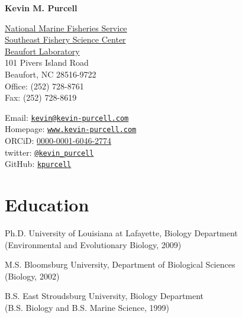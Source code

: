\documentclass[letterpaper]{article}
\def\name{Kevin M. Purcell}
\renewenvironment{itemize}{
  \begin{list}{}{
    \setlength{\leftmargin}{1em}
  }
}{
  \end{list}
}
\begin{document}
\centerline{\huge\bf \name}
\hrulefill
\vspace{0.25in}

\begin{minipage}[t]{0.5\textwidth}
  \href{http://nmfs.noaa.gov/}{National Marine Fisheries Service}\\
  \href{http://www.sefsc.noaa.gov/labs/beaufort/}{Southeast Fishery Science Center}\\
  \href{http://www.biology.ull.edu/}{Beaufort Laboratory} \\
  101 Pivers Island Road \\
  Beaufort, NC 28516-9722 \\
  Office: (252) 728-8761 \\
  Fax: (252) 728-8619 \\

\end{minipage}
\begin{minipage}[t]{0.5\textwidth}
  Email: \href{mailto:kevin@kevin-purcell.com}{\tt kevin@kevin-purcell.com} \\
  Homepage: \href{http:www.kevin-purcell.com/}{\tt www.kevin-purcell.com} \\
  ORCiD: \href{http://orcid.org/0000-0001-6046-2774}{0000-0001-6046-2774} \\
  twitter: \href{https://twitter.com/kevin_purcell}{\tt @kevin_purcell} \\
  GitHub: \href{https://github.com/kpurcell}{\tt kpurcell} \\
\end{minipage}


\section*{Education}
	\begin{itemize}
		\item Ph.D. University of Louisiana at Lafayette, Biology Department \\
     (Environmental and Evolutionary Biology, 2009)

		\item M.S. Bloomsburg University, Department of Biological Sciences \\
			(Biology, 2002)
      
		\item B.S. East Stroudsburg University, Biology Department \\
			(B.S. Biology and B.S. Marine Science, 1999)
	\end{itemize}
\end{document}
